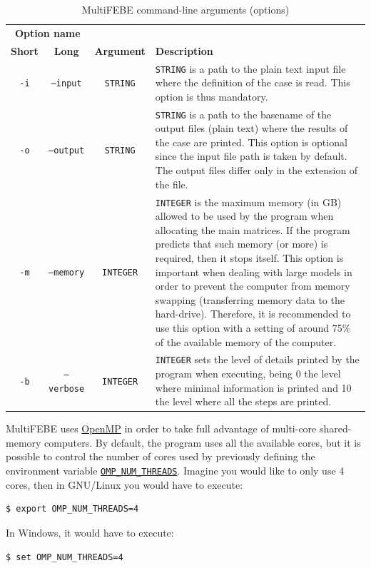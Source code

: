 \documentclass[a4paper,fleqn]{book}
\begin{document}
\begin{table}[h]
\centering
\begin{tabular}{cccp{7cm}}
\multicolumn{2}{c}{\textbf{Option name}} &  &\\
\textbf{Short} & \textbf{Long} & \textbf{Argument} & \textbf{Description} \\
\midrule
\texttt{-i} & \texttt{--input} & \texttt{STRING} & \texttt{STRING} is a path to the plain text input file where the definition of the case is read. This option is thus mandatory.
\\
\texttt{-o} & \texttt{--output} & \texttt{STRING} & \texttt{STRING} is a path to the basename of the output files (plain text) where the results of the case are printed. This option is optional since the input file path is taken by default. The output files differ only in the extension of the file.
\\
\texttt{-m} & \texttt{--memory} & \texttt{INTEGER} & \texttt{INTEGER} is the maximum memory (in GB) allowed to be used by the program when allocating the main matrices. If the program predicts that such memory (or more) is required, then it stops itself.  This option is important when dealing with large models in order to prevent the computer from memory swapping (transferring memory data to the hard-drive). Therefore, it is recommended to use this option with a setting of around 75\% of the available memory of the computer.
\\
\texttt{-b} & \texttt{--verbose} & \texttt{INTEGER} & \texttt{INTEGER} sets the level of details printed by the program when executing, being 0 the level where minimal information is printed and 10 the level where all the steps are printed.
\end{tabular}
\caption{MultiFEBE command-line arguments (options)}
\label{tab:options}
\end{table}

MultiFEBE uses \href{https://www.openmp.org/}{OpenMP} in order to take full advantage of multi-core shared-memory computers. By default, the program uses all the available cores, but it is possible to control the number of cores used by previously defining the environment variable \href{https://www.openmp.org/spec-html/5.0/openmpse50.html}{\texttt{OMP\_NUM\_THREADS}}. Imagine you would like to only use 4 cores, then in GNU/Linux you would have to execute:
\begin{Verbatim}[frame=single, fontsize=\small]
$ export OMP_NUM_THREADS=4
\end{Verbatim}
In Windows, it would have to execute:
\begin{Verbatim}[frame=single, fontsize=\small]
$ set OMP_NUM_THREADS=4
\end{Verbatim}
\end{document}

